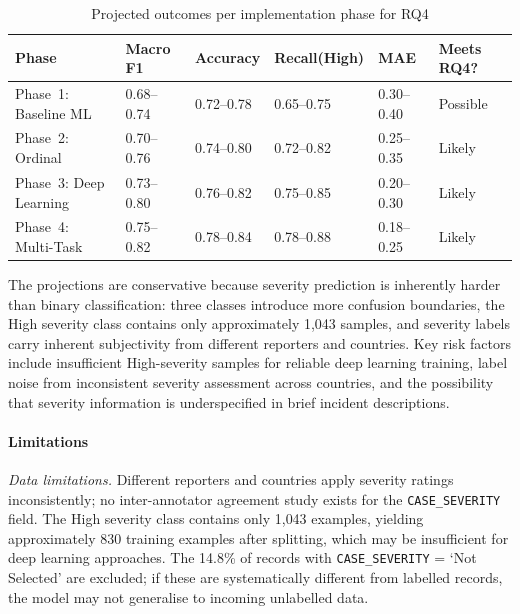 \documentclass[11pt, titlepage, bibliography=totoc]{scrreprt}
\begin{document}
\begin{table}[H]
\centering
\caption{Projected outcomes per implementation phase for RQ4}
\label{tab:rq4_outcomes}
\begin{tabular}{llllll}
\toprule
\textbf{Phase} & \textbf{Macro F1} & \textbf{Accuracy} & \textbf{Recall(High)} & \textbf{MAE} & \textbf{Meets RQ4?} \\
\midrule
Phase~1: Baseline ML    & 0.68--0.74 & 0.72--0.78 & 0.65--0.75 & 0.30--0.40 & Possible \\
Phase~2: Ordinal        & 0.70--0.76 & 0.74--0.80 & 0.72--0.82 & 0.25--0.35 & Likely \\
Phase~3: Deep Learning  & 0.73--0.80 & 0.76--0.82 & 0.75--0.85 & 0.20--0.30 & Likely \\
Phase~4: Multi-Task     & 0.75--0.82 & 0.78--0.84 & 0.78--0.88 & 0.18--0.25 & Likely \\
\bottomrule
\end{tabular}
\end{table}

The projections are conservative because severity prediction is inherently harder than binary classification: three classes introduce more confusion boundaries, the High severity class contains only approximately 1{,}043 samples, and severity labels carry inherent subjectivity from different reporters and countries. Key risk factors include insufficient High-severity samples for reliable deep learning training, label noise from inconsistent severity assessment across countries, and the possibility that severity information is underspecified in brief incident descriptions.

\paragraph{Limitations}

\textit{Data limitations.} Different reporters and countries apply severity ratings inconsistently; no inter-annotator agreement study exists for the \texttt{CASE\_SEVERITY} field. The High severity class contains only 1{,}043 examples, yielding approximately 830 training examples after splitting, which may be insufficient for deep learning approaches. The 14.8\% of records with \texttt{CASE\_SEVERITY} = `Not Selected' are excluded; if these are systematically different from labelled records, the model may not generalise to incoming unlabelled data.
\end{document}
